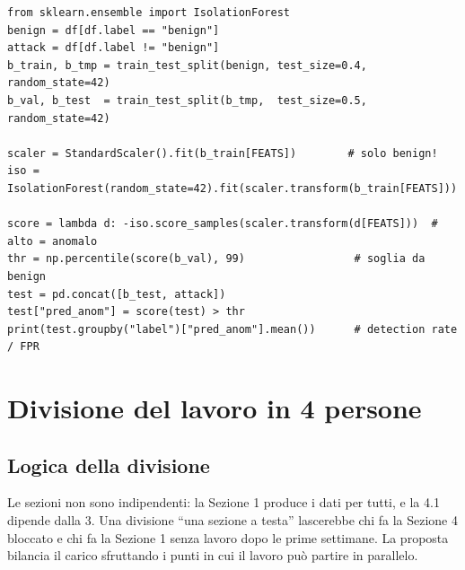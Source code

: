 \begin{lstlisting}[style=ddos]
from sklearn.ensemble import IsolationForest
benign = df[df.label == "benign"]
attack = df[df.label != "benign"]
b_train, b_tmp = train_test_split(benign, test_size=0.4, random_state=42)
b_val, b_test  = train_test_split(b_tmp,  test_size=0.5, random_state=42)

scaler = StandardScaler().fit(b_train[FEATS])        # solo benign!
iso = IsolationForest(random_state=42).fit(scaler.transform(b_train[FEATS]))

score = lambda d: -iso.score_samples(scaler.transform(d[FEATS]))  # alto = anomalo
thr = np.percentile(score(b_val), 99)                 # soglia da benign
test = pd.concat([b_test, attack])
test["pred_anom"] = score(test) > thr
print(test.groupby("label")["pred_anom"].mean())      # detection rate / FPR
\end{lstlisting}

\section{Divisione del lavoro in 4 persone}

\subsection{Logica della divisione}
Le sezioni non sono indipendenti: la Sezione 1 produce i dati per tutti, e la
4.1 dipende dalla 3. Una divisione ``una sezione a testa'' lascerebbe chi fa la
Sezione 4 bloccato e chi fa la Sezione 1 senza lavoro dopo le prime settimane.
La proposta bilancia il carico sfruttando i punti in cui il lavoro può partire
in parallelo.

